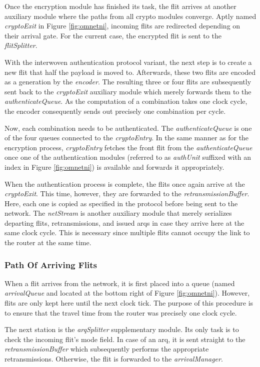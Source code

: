 Once the encryption module has finished its task, the flit arrives at another auxiliary module where the paths from all crypto modules converge.
Aptly named \textit{cryptoExit} in Figure \ref{fig:omnetni}, incoming flits are redirected depending on their arrival gate. For the current case, the
encrypted flit is sent to the \textit{flitSplitter}.

With the interwoven authentication protocol variant, the next step is to create a new flit that half the payload is moved to. Afterwards, these two
flits are encoded as a generation by the \textit{encoder}. The resulting three or four flits are subsequently sent back to the \textit{cryptoExit}
auxiliary module which merely forwards them to the \textit{authenticateQueue}. As the computation of a combination takes one clock cycle, the encoder
consequently sends out precisely one combination per cycle.

Now, each combination needs to be authenticated. The \textit{authenticateQueue} is one of the four queues connected to the \textit{cryptoEntry}. In
the same manner as for the encryption process, \textit{cryptoEntry} fetches the front flit from the \textit{authenticateQueue} once one of the
authentication modules (referred to as \textit{authUnit} suffixed with an index in Figure \ref{fig:omnetni}) is available and forwards it
appropriately.

When the authentication process is complete, the flits once again arrive at the \textit{cryptoExit}. This time, however, they are forwarded to the
\textit{retransmissionBuffer}. Here, each one is copied as specified in the protocol before being sent to the network. The \textit{netStream} is
another auxiliary module that merely serializes departing flits, retransmissions, and issued \glspl{arq} in case they arrive here at the same clock
cycle. This is necessary since multiple flits cannot occupy the link to the router at the same time.

\subsubsection{Path Of Arriving Flits}
When a flit arrives from the network, it is first placed into a queue (named \textit{arrivalQueue} and located at the bottom right of Figure
\ref{fig:omnetni}). However, flits are only kept here until the next clock tick. The purpose of this procedure is to ensure that the travel time from
the router was precisely one clock cycle.

The next station is the \textit{arqSplitter} supplementary module. Its only task is to check the incoming flit's mode field. In case of an
\gls{arq}, it is sent straight to the \textit{retransmissionBuffer} which subsequently performs the appropriate retransmissions. Otherwise, the flit
is forwarded to the \textit{arrivalManager}.

